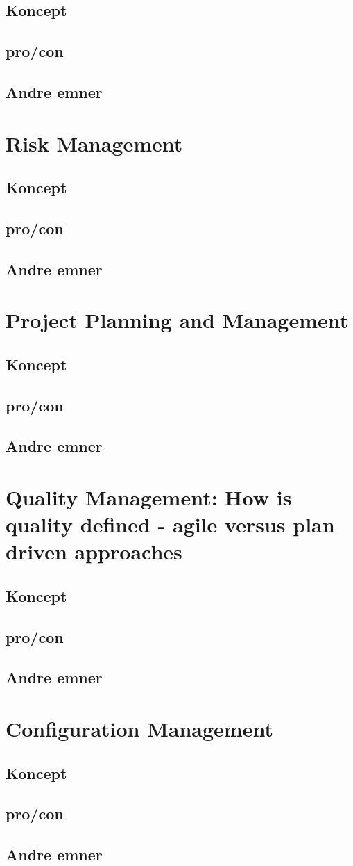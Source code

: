 \documentclass[11pt,a4paper]{article}
\begin{document}
\subsection{Koncept}
\subsection{pro/con}
\subsection{Andre emner}
\newpage
\section{Risk Management}
\subsection{Koncept}
\subsection{pro/con}
\subsection{Andre emner}
\newpage
\section{Project Planning and Management}
\subsection{Koncept}
\subsection{pro/con}
\subsection{Andre emner}
\newpage
\section{Quality Management: How is quality defined - agile versus plan driven approaches}
\subsection{Koncept}
\subsection{pro/con}
\subsection{Andre emner}
\newpage
\section{Configuration Management}
\subsection{Koncept}
\subsection{pro/con}
\subsection{Andre emner}
\newpage
\end{document}
